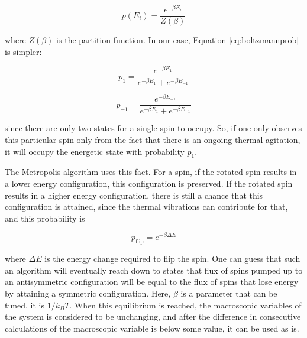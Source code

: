 \begin{equation}
\label{eq:boltzmannprob}
p(E_i) = \frac{e^{-\beta E_i}}{Z(\beta)}
\end{equation}

where $ Z(\beta) $ is the partition function. In our case, Equation \eqref{eq:boltzmannprob} is simpler:

\begin{equation}
\label{eq:sinlespinboltzmann1}
p_1 = \frac{e^{-\beta E_1}}{e^{-\beta E_1}+e^{-\beta E_{-1}}}
\end{equation}

\begin{equation}
\label{eq:sinlespinboltzmann2}
p_{-1} = \frac{e^{-\beta E_{-1}}}{e^{-\beta E_1}+e^{-\beta E_{-1}}}
\end{equation}

since there are only two states for a single spin to occupy. So, if one only observes this particular spin only from the fact that there is an ongoing thermal agitation, it will occupy the energetic state with probability $ p_1 $. 

The Metropolis algorithm uses this fact. For a spin, if the rotated spin results in a lower energy configuration, this configuration is preserved. If the rotated spin results in a higher energy configuration, there is still a chance that this configuration is attained, since the thermal vibrations can contribute for that, and this probability is 

\[p_{\text{flip}} = e^{-\beta \Delta E}\] 

where $ \Delta E $ is the energy change required to flip the spin. One can guess that such an algorithm will eventually reach down to states that flux of spins pumped up to an antisymmetric configuration will be equal to the flux of spins that lose energy by attaining a symmetric configuration. Here, $ \beta $ is a parameter that can be tuned, it is $ 1/k_B T $. When this equilibrium is reached, the macroscopic variables of the system is considered to be unchanging, and after the difference in consecutive calculations of the macroscopic variable is below some value, it can be used as is. 

